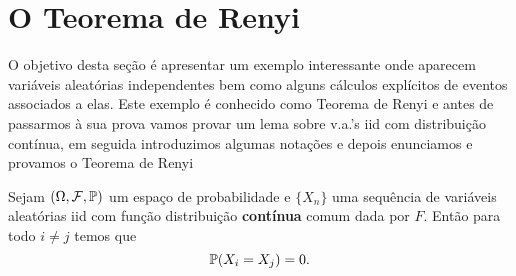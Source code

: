 \section{O Teorema de Renyi}\label{sec-teo-Renyi}

O objetivo desta seção é apresentar um exemplo 
interessante onde aparecem variáveis aleatórias 
independentes bem como alguns cálculos explícitos de eventos 
associados a elas. Este exemplo é conhecido como 
Teorema de Renyi e antes de passarmos à sua prova
vamos provar um lema sobre v.a.'s iid com distribuição 
contínua, em seguida introduzimos algumas notações e 
depois enunciamos e provamos o Teorema de Renyi




\begin{lema}\label{lema-P(X_i-dif-X_j)=1}
Sejam $(\Omega,\F,\P)$ um espaço de probabilidade e 
$\{X_n\}$ uma sequência de variáveis aleatórias
iid com função distribuição {\bf contínua} comum 
dada por $F$. Então para todo $i\neq j$ temos que
	\[
		\P(X_i=X_j)=0.
	\]
\end{lema}


